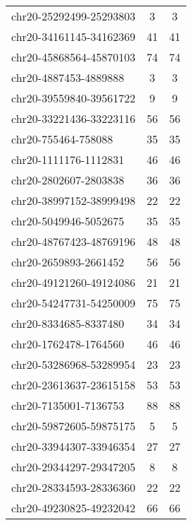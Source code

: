 \begin{longtable}{lSS}
	chr20-25292499-25293803 & 3      & 3                          \\
	chr20-34161145-34162369 & 41     & 41                         \\
	chr20-45868564-45870103 & 74     & 74                         \\
	chr20-4887453-4889888   & 3      & 3                          \\
	chr20-39559840-39561722 & 9      & 9                          \\
	chr20-33221436-33223116 & 56     & 56                         \\
	chr20-755464-758088     & 35     & 35                         \\
	chr20-1111176-1112831   & 46     & 46                         \\
	chr20-2802607-2803838   & 36     & 36                         \\
	chr20-38997152-38999498 & 22     & 22                         \\
	chr20-5049946-5052675   & 35     & 35                         \\
	chr20-48767423-48769196 & 48     & 48                         \\
	chr20-2659893-2661452   & 56     & 56                         \\
	chr20-49121260-49124086 & 21     & 21                         \\
	chr20-54247731-54250009 & 75     & 75                         \\
	chr20-8334685-8337480   & 34     & 34                         \\
	chr20-1762478-1764560   & 46     & 46                         \\
	chr20-53286968-53289954 & 23     & 23                         \\
	chr20-23613637-23615158 & 53     & 53                         \\
	chr20-7135001-7136753   & 88     & 88                         \\
	chr20-59872605-59875175 & 5      & 5                          \\
	chr20-33944307-33946354 & 27     & 27                         \\
	chr20-29344297-29347205 & 8      & 8                          \\
	chr20-28334593-28336360 & 22     & 22                         \\
	chr20-49230825-49232042 & 66     & 66                         \\

\end{longtable}
